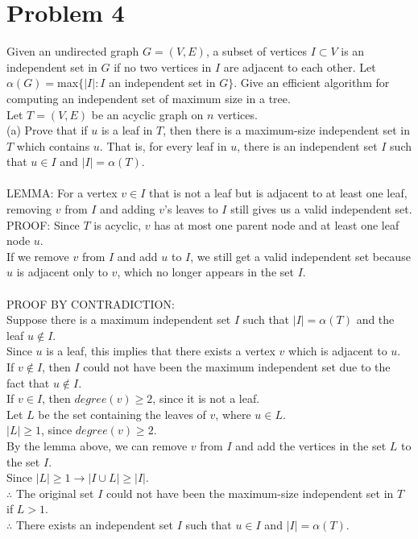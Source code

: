 \documentclass[11pt,letterpaper]{article}
\begin{document}
\section{Problem 4}
Given an undirected graph $G=(V,E)$, a subset of vertices $I \subset V$ is an independent set in $G$ if no two vertices in $I$ are adjacent to each other. Let $\alpha(G)=$max$\{|I|:I$ an independent set in $G\}$. Give an efficient algorithm for computing an independent set of maximum size in a tree. \\
Let $T=(V,E)$ be an acyclic graph on $n$ vertices.\\
(a) Prove that if $u$ is a leaf in $T$, then there is a maximum-size independent set in $T$ which contains $u$. That is, for every leaf in $u$, there is an independent set $I$ such that $u \in I$ and $|I|=\alpha(T)$.\\\\
LEMMA: For a vertex $v \in I$ that is not a leaf but is adjacent to at least one leaf, removing $v$ from $I$ and adding $v$'s leaves to $I$ still gives us a valid independent set. \\
PROOF: Since $T$ is acyclic, $v$ has at most one parent node and at least one leaf node $u$. \\
If we remove $v$ from $I$ and add $u$ to $I$, we still get a valid independent set because $u$ is adjacent only to $v$, which no longer appears in the set $I$. \\\\
PROOF BY CONTRADICTION: \\
Suppose there is a maximum independent set $I$ such that $|I|=\alpha(T)$ and the leaf $u \not\in I$. \\
Since $u$ is a leaf, this implies that there exists a vertex $v$ which is adjacent to $u$. \\
If $v \not \in I$, then $I$ could not have been the maximum independent set due to the fact that $u \not \in I$. \\
If $v \in I$, then $degree(v)\geq2$, since it is not a leaf. \\
Let $L$ be the set containing the leaves of $v$, where $u \in L$. \\
$|L|\geq1$, since $degree(v)\geq2$. \\
By the lemma above, we can remove $v$ from $I$ and add the vertices in the set $L$ to the set $I$. \\
Since $|L|\geq1 \rightarrow |I \cup L|\geq|I|$. \\
$\therefore$ The original set $I$ could not have been the maximum-size  independent set in $T$ if $L>1$. \\
$\therefore$ There exists an independent set $I$ such that $u \in I$ and $|I|=\alpha(T)$. 
\end{document}
